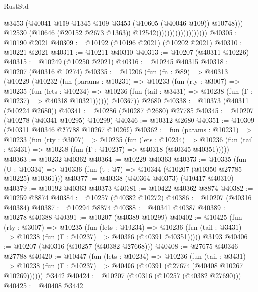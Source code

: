 \begin{lexlean}{RustStd}
\begin{coremodule}
                                              @3453
                                              (@40041
                                                @109
                                                @1345
                                                @109
                                                @3453
                                                (@10605 (@40046 @109))
                                                @10748)))
                                          @12530
                                          (@10646 (@20152 @2673 @1363))
                                          @12542)))))))))))))))))))
@40305 := @10190 @2021
@40309 := @10192 (@10196 @2021) (@10202 @2021)
@40310 := @10221 @2021
@40311 := @10211 @40310
@40313 := @10207 (@40311 @10226)
@40315 := @10249 (@10250 @2021)
@40316 := @10245 @40315
@40318 := @10207 (@40316 @10274)
@40335 := @10206
    (fun (fn : @89) =>
    @40313
      (@10229
        (@10232
          (fun (params : @10231) =>
          @10233
            (fun (rty : @3007) =>
            @10235
              (fun (lets : @10234) =>
              @10236 (fun (tail : @3431) => @10238 (fun (Γ : @10237) => @40318 @10321))))))
        @10367))
    @2680
@40338 := @10373 (@40311 (@10224 @2680))
@40341 := @10286 (@10287 @2680) @27785
@40345 := @10207 (@10278 (@40341 @10295) @10299)
@40346 := @10312 @2680
@40351 := @10309 (@10311 @40346 @27788 @10267 @10269)
@40362 := fun (params : @10231) =>
  @10233
    (fun (rty : @3007) =>
    @10235
      (fun (lets : @10234) =>
      @10236 (fun (tail : @3431) => @10238 (fun (Γ : @10237) => @40318 (@40345 @40351)))))
@40363 := @10232 @40362
@40364 := @10229 @40363
@40373 := @10335
    (fun (U : @10334) => @10336 (fun (t : @7) => @10344 (@10207 (@10350 @27785 @10225) @10361)))
@40377 := @40338 (@40364 @40373) (@10417 @40310)
@40379 := @10192 @40363 @40373
@40381 := @10422 @40362 @8874
@40382 := @10259 @8874
@40384 := @10257 (@40382 @10272)
@40386 := @10207 (@40316 @40384)
@40387 := @10294 @8874
@40388 := @40341 @40387
@40389 := @10278 @40388
@40391 := @10207 (@40389 @10299)
@40402 := @10425
    (fun (rty : @3007) =>
    @10235
      (fun (lets : @10234) =>
      @10236 (fun (tail : @3431) => @10238 (fun (Γ : @10237) => @40386 (@40391 @40351)))))
    @3193
@40406 := @10207 (@40316 (@10257 (@40382 @27668)))
@40408 := @27675 @40346 @27788
@40420 := @10447
    (fun (lets : @10234) =>
    @10236
      (fun (tail : @3431) =>
      @10238 (fun (Γ : @10237) => @40406 (@40391 (@27674 (@40408 @10267 @10269))))))
    @3442
@40424 := @10207 (@40316 (@10257 (@40382 @27690)))
@40425 := @40408 @3442

\end{coremodule}
\end{lexlean}
